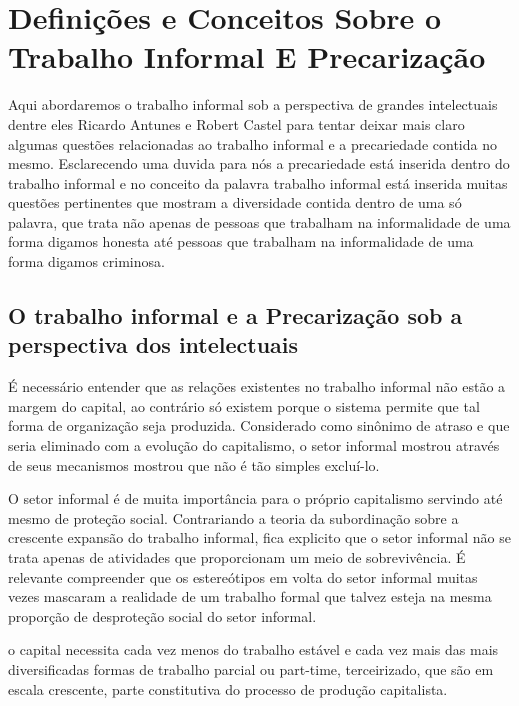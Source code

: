 \chapter{Definições e Conceitos Sobre o Trabalho Informal E Precarização}

Aqui abordaremos o trabalho informal sob a perspectiva de grandes intelectuais dentre eles Ricardo Antunes 
e Robert Castel para tentar deixar mais claro algumas questões relacionadas ao trabalho informal e a 
precariedade contida no mesmo. Esclarecendo uma duvida para nós a precariedade está inserida dentro do 
trabalho informal e no conceito da palavra trabalho informal está inserida muitas questões pertinentes que 
mostram a diversidade contida dentro de uma só palavra, que trata não apenas de pessoas que trabalham na 
informalidade de uma forma digamos honesta até pessoas que trabalham na informalidade de uma forma digamos 
criminosa. 

\section{O trabalho informal e a Precarização sob a perspectiva dos intelectuais}

É necessário entender que as relações existentes no trabalho informal não estão a margem do capital, ao 
contrário só existem porque o sistema permite que tal forma de organização seja produzida. Considerado 
como sinônimo de atraso e que seria eliminado com a evolução do capitalismo, o setor informal mostrou 
através de seus mecanismos mostrou que não é tão simples excluí-lo. 

O setor informal é de muita importância para o próprio capitalismo servindo até mesmo de proteção social.
Contrariando a teoria da subordinação sobre a crescente expansão do trabalho informal, fica explicito 
que o setor informal não se trata apenas de atividades que proporcionam um meio de sobrevivência. É 
relevante compreender que os estereótipos em volta do setor informal muitas vezes mascaram a realidade 
de um trabalho formal que talvez esteja na mesma proporção de desproteção social do setor informal.

\begin{citacao}
o capital necessita cada vez menos do trabalho estável e cada vez mais das mais 
diversificadas formas de trabalho parcial ou part-time, terceirizado, que são em 
escala crescente, parte constitutiva do processo de produção capitalista. \cite{antunes2011modos}
\end{citacao}

